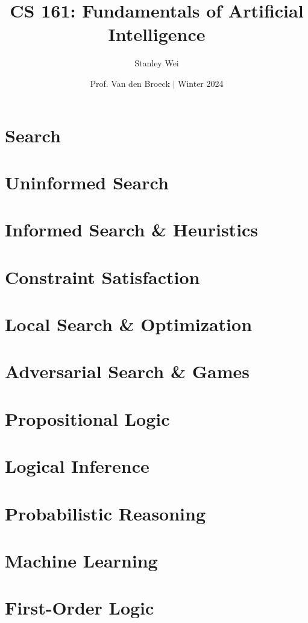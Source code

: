 \documentclass[12pt]{extarticle}
\title{CS 161: Fundamentals of Artificial Intelligence}
\author{Stanley Wei}
\date{Prof. Van den Broeck $\vert$ Winter 2024}
\theoremstyle{definition}
\theoremstyle{remark}
\begin{document}
\maketitle
\tableofcontents

\pagebreak


\pagebreak
\section{Search}


\pagebreak
\section{Uninformed Search}


\pagebreak
\section{Informed Search \& Heuristics}


\pagebreak
\section{Constraint Satisfaction}


\pagebreak
\section{Local Search \& Optimization}


\pagebreak
\section{Adversarial Search \& Games}



\pagebreak
\section{Propositional Logic}


\pagebreak
\section{Logical Inference}


\pagebreak
\section{Probabilistic Reasoning}


\pagebreak
\section{Machine Learning}


\pagebreak
\section{First-Order Logic}

\end{document}
